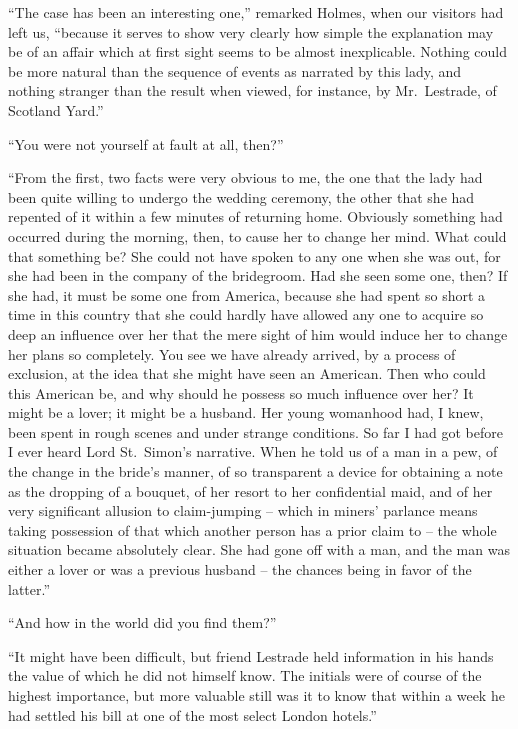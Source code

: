 \strut

“The case has been an interesting one,” remarked Holmes,
when our visitors had left us, “because it serves to show very
clearly how simple the explanation may be of an affair which
at first sight seems to be almost inexplicable. Nothing could
be more natural than the sequence of events as narrated by
this lady, and nothing stranger than the result when viewed,
for instance, by Mr.~Lestrade, of Scotland Yard.”

“You were not yourself at fault at all, then?”

“From the first, two facts were very obvious to me, the one
that the lady had been quite willing to undergo the wedding
ceremony, the other that she had repented of it within a few
minutes of returning home. Obviously something had occurred
during the morning, then, to cause her to change her
mind. What could that something be? She could not have
spoken to any one when she was out, for she had been in the
company of the bridegroom. Had she seen some one, then?
If she had, it must be some one from America, because she
had spent so short a time in this country that she could hardly
have allowed any one to acquire so deep an influence over her
that the mere sight of him would induce her to change her
plans so completely. You see we have already arrived, by a
process of exclusion, at the idea that she might have seen an
American. Then who could this American be, and why should
he possess so much influence over her? It might be a lover;
it might be a husband. Her young womanhood had, I knew,
been spent in rough scenes and under strange conditions. So
far I had got before I ever heard Lord St.~Simon’s narrative.
When he told us of a man in a pew, of the change in the
bride’s manner, of so transparent a device for obtaining a note
as the dropping of a bouquet, of her resort to her confidential
maid, and of her very significant allusion to claim-jumping -- which
in miners’ parlance means taking possession of that
which another person has a prior claim to -- the whole situation
became absolutely clear. She had gone off with a man, and
the man was either a lover or was a previous husband -- the
chances being in favor of the latter.”

“And how in the world did you find them?”

“It might have been difficult, but friend Lestrade held
information in his hands the value of which he did not himself
know. The initials were of course of the highest importance,
but more valuable still was it to know that within a week he
had settled his bill at one of the most select London hotels.”

